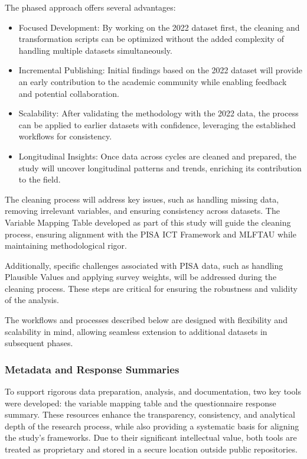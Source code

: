 \documentclass[
]{article}
\begin{document}
The phased approach offers several advantages:

\begin{itemize}
\item
  Focused Development: By working on the 2022 dataset first, the
  cleaning and transformation scripts can be optimized without the added
  complexity of handling multiple datasets simultaneously.
\item
  Incremental Publishing: Initial findings based on the 2022 dataset
  will provide an early contribution to the academic community while
  enabling feedback and potential collaboration.
\item
  Scalability: After validating the methodology with the 2022 data, the
  process can be applied to earlier datasets with confidence, leveraging
  the established workflows for consistency.
\item
  Longitudinal Insights: Once data across cycles are cleaned and
  prepared, the study will uncover longitudinal patterns and trends,
  enriching its contribution to the field.
\end{itemize}

The cleaning process will address key issues, such as handling missing
data, removing irrelevant variables, and ensuring consistency across
datasets. The Variable Mapping Table developed as part of this study
will guide the cleaning process, ensuring alignment with the PISA ICT
Framework and MLFTAU while maintaining methodological rigor.

Additionally, specific challenges associated with PISA data, such as
handling Plausible Values and applying survey weights, will be addressed
during the cleaning process. These steps are critical for ensuring the
robustness and validity of the analysis.

The workflows and processes described below are designed with
flexibility and scalability in mind, allowing seamless extension to
additional datasets in subsequent phases.

\hypertarget{metadata-and-response-summaries}{%
\subsubsection{Metadata and Response
Summaries}\label{metadata-and-response-summaries}}

To support rigorous data preparation, analysis, and documentation, two
key tools were developed: the variable mapping table and the
questionnaire response summary. These resources enhance the
transparency, consistency, and analytical depth of the research process,
while also providing a systematic basis for aligning the study's
frameworks. Due to their significant intellectual value, both tools are
treated as proprietary and stored in a secure location outside public
repositories.
\end{document}
